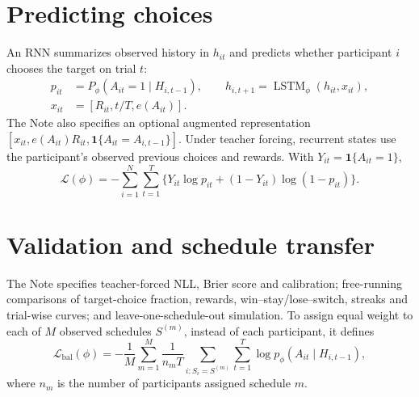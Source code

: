 \documentclass[11pt]{article}
\begin{document}
\section{Predicting choices}
An RNN summarizes observed history in $h_{it}$ and predicts whether participant $i$ chooses the target on trial $t$:
\begin{align}
p_{it}&=P_\phi(A_{it}=1\mid H_{i,t-1}),\qquad
h_{i,t+1}=\operatorname{LSTM}_\phi(h_{it},x_{it}),\label{eq:rnn}\\
x_{it}&=[R_{it},t/T,e(A_{it})].\label{eq:features}
\end{align}
The Note also specifies an optional augmented representation $[x_{it},e(A_{it})R_{it},\mathbf1\{A_{it}=A_{i,t-1}\}]$. Under teacher forcing, recurrent states use the participant's observed previous choices and rewards. With $Y_{it}=\mathbf1\{A_{it}=1\}$,
\begin{equation}
\mathcal L(\phi)=-\sum_{i=1}^{N}\sum_{t=1}^{T}\{Y_{it}\log p_{it}+(1-Y_{it})\log(1-p_{it})\}.\label{eq:nll}
\end{equation}
\section{Validation and schedule transfer}
The Note specifies teacher-forced NLL, Brier score and calibration; free-running comparisons of target-choice fraction, rewards, win--stay/lose--switch, streaks and trial-wise curves; and leave-one-schedule-out simulation. To assign equal weight to each of $M$ observed schedules $S^{(m)}$, instead of each participant, it defines
\begin{equation}
\mathcal L_{\mathrm{bal}}(\phi)=-\frac1M\sum_{m=1}^{M}\frac{1}{n_m T}\sum_{i:S_i=S^{(m)}}\sum_{t=1}^{T}\log p_\phi(A_{it}\mid H_{i,t-1}),
\label{eq:balanced}
\end{equation}
where $n_m$ is the number of participants assigned schedule $m$.
\end{document}
